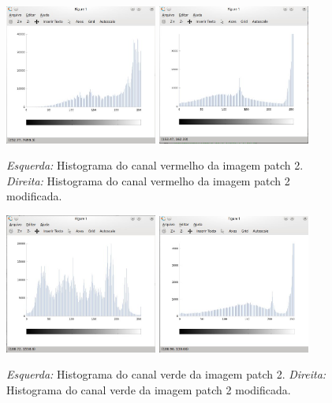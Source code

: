 \begin{figure}[h]
    \centering
    \includegraphics[width=5cm]{histPatch2Red.jpg}
    \includegraphics[width=5cm]{histFinalPatch2Red.jpg}
    \caption{\emph{Esquerda:} Histograma do canal vermelho da imagem patch 2. \emph{Direita:} Histograma do canal vermelho da imagem patch 2 modificada.}
    \label{fig:result1}
\end{figure}


\begin{figure}[h]
    \centering
    \includegraphics[width=5cm]{histPatch2Green.jpg}
    \includegraphics[width=5cm]{histFinalPatch2Green.jpg}
    \caption{\emph{Esquerda:} Histograma do canal verde da imagem patch 2. \emph{Direita:} Histograma do canal verde da imagem patch 2 modificada.}
    \label{fig:result2}
\end{figure}


